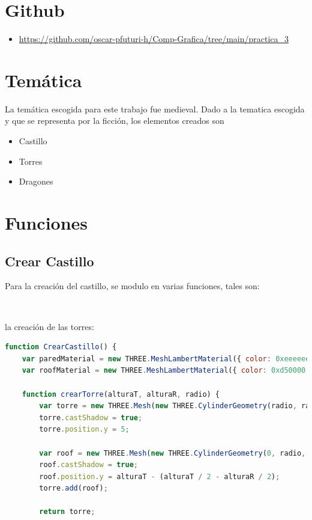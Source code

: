 \documentclass[11pt]{article}
\begin{document}
\tableofcontents 

\newpage
\section{Github}

\begin{itemize}
    \item \url{https://github.com/oscar-pfuturi-h/Comp-Grafica/tree/main/practica_3}
\end{itemize}

\section{Temática}
La temática escogida para este trabajo fue medieval. Dado a la tematica escogida y que se representa por la ficción, los elementos creados son 

\begin{itemize}
    \item Castillo
    \item Torres
    \item Dragones
\end{itemize}

\section{Funciones}

\subsection{Crear Castillo}
Para la creación del castillo, se modulo en varias funciones, tales son:

\

la creación de las torres:

\begin{lstlisting}[language=javascript,frame=single]
function CrearCastillo() {
    var paredMaterial = new THREE.MeshLambertMaterial({ color: 0xeeeeee });
    var roofMaterial = new THREE.MeshLambertMaterial({ color: 0xd50000 });

    function crearTorre(alturaT, alturaR, radio) {
        var torre = new THREE.Mesh(new THREE.CylinderGeometry(radio, radio, alturaT, 30), paredMaterial);
        torre.castShadow = true;
        torre.position.y = 5;

        var roof = new THREE.Mesh(new THREE.CylinderGeometry(0, radio, alturaR, 30), roofMaterial);
        roof.castShadow = true;
        roof.position.y = alturaT - (alturaT / 2 - alturaR / 2);
        torre.add(roof);

        return torre;
\end{lstlisting}
\end{document}
